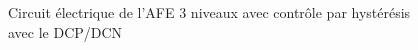 \begin{figure}[htb]
\caption{Circuit électrique de l'AFE 3 niveaux avec contrôle par hystérésis avec le DCP/DCN}
\label{circuit_AFE_3L_RC_DCP_DCN}
\end{figure}


